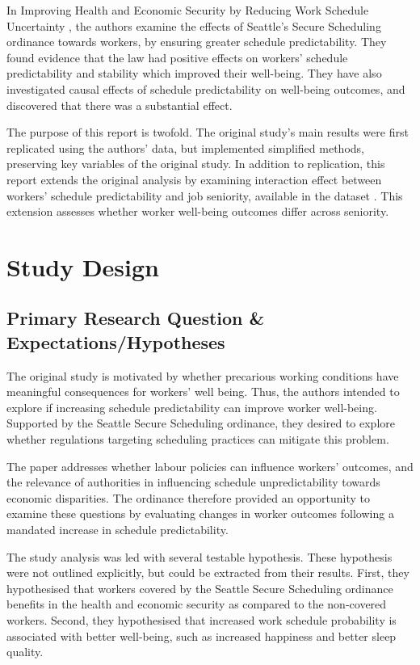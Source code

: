 \documentclass{article}
\begin{document}
	In Improving Health and Economic Security by Reducing Work Schedule Uncertainty \cite{harknett2021}, the authors examine the effects of Seattle's Secure Scheduling ordinance towards workers, by ensuring greater schedule predictability. They found evidence that the law
	had positive effects on workers’ schedule predictability and stability which improved their well-being. They have also investigated causal effects of schedule predictability on well-being outcomes, and discovered that there was a substantial effect.
	
	The purpose of this report is twofold. The original study's main results were first replicated using the authors’ data, but implemented simplified methods, preserving key variables of the original study. In addition to replication, this report extends the original analysis by examining interaction effect between workers' schedule predictability and job seniority, available in the dataset \cite{harknett2021data}. This extension assesses whether worker well-being outcomes differ across seniority.
	
	\section{Study Design}
	
	\subsection{Primary Research Question \& Expectations/Hypotheses}
	
	The original study is motivated by whether precarious working conditions have meaningful consequences for workers' well being. Thus, the authors intended to explore if increasing schedule predictability can improve worker well-being. Supported by the Seattle Secure Scheduling ordinance, they desired to explore whether regulations targeting scheduling practices can mitigate this problem.
	
	The paper addresses whether labour policies can influence workers' outcomes, and the relevance of authorities in influencing schedule unpredictability towards economic disparities. The ordinance therefore provided an opportunity to examine these questions by evaluating changes in worker outcomes following a mandated increase in schedule predictability.
	
	The study analysis was led with several testable hypothesis. These hypothesis were not outlined explicitly, but could be extracted from their results. First, they hypothesised that workers covered by the Seattle Secure Scheduling ordinance benefits in the health and economic security as compared to the non-covered workers. Second, they hypothesised that increased work schedule probability is associated with better well-being, such as increased happiness and better sleep quality.
	
\end{document}
